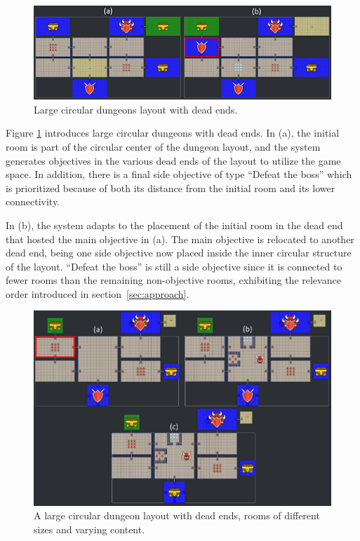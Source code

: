 \begin{figure}[h]
  \centering
  \includegraphics[width=\columnwidth]{included-papers-tex/paper-7/Figures/results6.png}
  \caption{Large circular dungeons layout with dead ends.}
  \label{fig:oldfig10}
\end{figure}

Figure \ref{fig:oldfig10} introduces large circular dungeons with dead ends. In (a), the initial room is part of the circular center of the dungeon layout, and the system generates objectives in the various dead ends of the layout to utilize the game space. In addition, there is a final side objective of type “Defeat the boss” which is prioritized because of both its distance from the initial room and its lower connectivity.%

In (b), the system adapts to the placement of the initial room in the dead end that hosted the main objective in (a). The main objective is relocated to another dead end, being one side objective now placed inside the inner circular structure of the layout. “Defeat the boss” is still a side objective since it is connected to fewer rooms than the remaining non-objective rooms, exhibiting the relevance order introduced in section~\ref{sec:approach}.%

\begin{figure}[h]
  \centering
  \includegraphics[width=\columnwidth]{included-papers-tex/paper-7/Figures/results7.png}
  \caption{A large circular dungeon layout with dead ends, rooms of different sizes and varying content.}
  \label{fig:oldfig11}
\end{figure}

